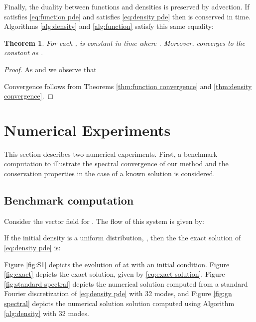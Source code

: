 \documentclass[final,leqno]{amsart}
\newtheorem{theorem}{Theorem}[section]
\begin{document}
Finally, the duality between functions and densities is preserved by advection.  If  satisfies \eqref{eq:function pde} and  satisfies \eqref{eq:density pde} then  is conserved in time.
Algorithms \ref{alg:density} and \ref{alg:function} satisfy this same equality:
\begin{theorem}
	For each ,  is constant in time where .
	Moreover,  converges to the constant  as .
\end{theorem}
\begin{proof}
	As  and  we observe that
	
	Convergence follows from Theorems \ref{thm:function convergence} and \ref{thm:density convergence}.
\end{proof}


\section{Numerical Experiments} \label{sec:numerics}

This section describes two numerical experiments.  First, a benchmark computation to illustrate the spectral convergence of our method and the conservation properties in the case of a known solution is considered.

\subsection{Benchmark computation}
\label{sec:benchmark}
Consider the vector field  for .
The flow of this system is given by:

If the initial density is a uniform distribution, , then the the exact solution of \eqref{eq:density pde} is:

Figure \ref{fig:S1} depicts the evolution of  at  with an initial condition.
Figure \ref{fig:exact} depicts the exact solution, given by \eqref{eq:exact solution},  Figure \ref{fig:standard spectral} depicts the numerical solution computed from a standard Fourier discretization of \eqref{eq:density pde} with 32 modes, and Figure \ref{fig:gn spectral} depicts the numerical solution solution computed using Algorithm \ref{alg:density} with 32 modes.
\end{document}
